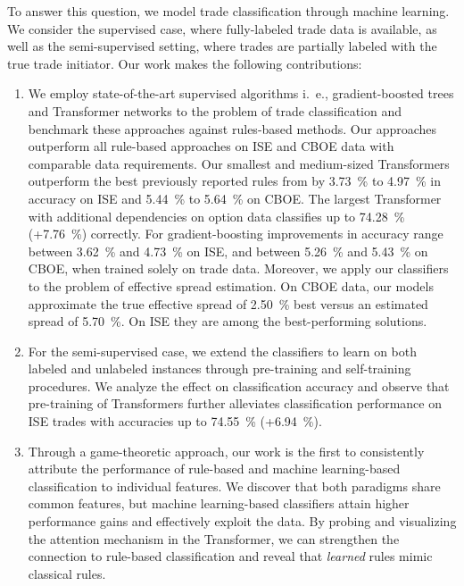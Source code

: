 To answer this question, we model trade classification through machine learning. We consider the supervised case, where fully-labeled trade data is available, as well as the semi-supervised setting, where trades are partially labeled with the true trade initiator. Our work makes the following contributions:
\begin{enumerate}[label=(\roman*),noitemsep]
    \item We employ state-of-the-art supervised algorithms i.~e., gradient-boosted trees and Transformer networks to the problem of trade classification and benchmark these approaches against rules-based methods. Our approaches outperform all rule-based approaches on \gls{ISE} and \gls{CBOE} data with comparable data requirements. Our smallest and medium-sized Transformers outperform the best previously reported rules from \textcite[\checkmark][13--15]{grauerOptionTradeClassification2022} by \SI{3.73}{\percent} to \SI{4.97}{\percent} in accuracy on \gls{ISE} and \SI{5.44}{\percent} to \SI{5.64}{\percent} on \gls{CBOE}. The largest Transformer with additional dependencies on option data classifies up to \SI{74.28}{\percent} (+\SI{7.76}{\percent}) correctly. For gradient-boosting improvements in accuracy range between \SI{3.62}{\percent} and \SI{4.73}{\percent} on \gls{ISE}, and between \SI{5.26}{\percent} and \SI{5.43}{\percent} on \gls{CBOE}, when trained solely on trade data. Moreover, we apply our classifiers to the problem of effective spread estimation. On \gls{CBOE} data, our models approximate the true effective spread of \SI{2.50}{\percent} best versus an estimated spread of \SI{5.70}{\percent}. On \gls{ISE} they are among the best-performing solutions.
    \item For the semi-supervised case, we extend the classifiers to learn on both labeled and unlabeled instances through pre-training and self-training procedures. We analyze the effect on classification accuracy and observe that pre-training of Transformers further alleviates classification performance on \gls{ISE} trades with accuracies up to \SI{74.55}{\percent} (+\SI{6.94}{\percent}).
    \item Through a game-theoretic approach, our work is the first to consistently attribute the performance of rule-based and machine learning-based classification to individual features. We discover that both paradigms share common features, but machine learning-based classifiers attain higher performance gains and effectively exploit the data. By probing and visualizing the attention mechanism in the Transformer, we can strengthen the connection to rule-based classification and reveal that \emph{learned} rules mimic classical rules.
\end{enumerate}

